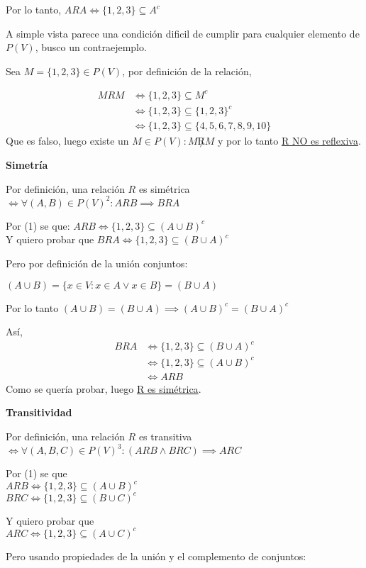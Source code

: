 Por lo tanto, $ ARA \iff \{ 1,2,3 \} \subseteq A^c $

A simple vista parece una condición dificil de cumplir para cualquier elemento de $ P(V) $, busco un contraejemplo.

Sea $ M = \{ 1,2,3 \} \in P(V) $, por definición de la relación, 

\begin{align*}
    MRM &\iff \{ 1,2,3 \} \subseteq M^c \\
    &\iff \{ 1,2,3 \} \subseteq \{ 1,2,3 \}^c \\
    &\iff \{ 1,2,3 \} \subseteq \{ 4,5,6,7,8,9,10 \}
\end{align*}
Que es falso, luego existe un $ M \in P(V): M\not R M $ y por lo tanto \underline{R NO es reflexiva}.

\textbf{Simetría}

Por definición, una relación $R$ es simétrica $ \iff \forall (A,B) \in P(V)^2: ARB \implies BRA$

Por (1) se que: $ ARB \iff \{ 1,2,3 \} \subseteq (A\cup B)^c$ \\
Y quiero probar que $ BRA \iff \{ 1,2,3 \} \subseteq (B\cup A)^c$

Pero por definición de la unión conjuntos:

$ (A\cup B) = \{ x \in V: x\in A \vee x \in B \} = (B\cup A) $

Por lo tanto $ (A\cup B) = (B\cup A) \implies (A\cup B)^c = (B\cup A)^c $

Así, 
\begin{align*}
    BRA &\iff \{ 1,2,3 \} \subseteq (B\cup A)^c \\
    &\iff \{ 1,2,3 \} \subseteq (A\cup B)^c \\
    &\iff ARB
\end{align*}
Como se quería probar, luego \underline{R es simétrica}.

\textbf{Transitividad}

Por definición, una relación $R$ es transitiva $ \iff \forall (A,B,C) \in P(V)^3: (ARB \wedge BRC) \implies ARC $

Por (1) se que \\
$ ARB \iff \{ 1,2,3 \} \subseteq (A\cup B)^c$ \\
$ BRC \iff \{ 1,2,3 \} \subseteq (B\cup C)^c$

Y quiero probar que \\
$ ARC \iff \{ 1,2,3 \} \subseteq (A\cup C)^c$

Pero usando propiedades de la unión y el complemento de conjuntos:

